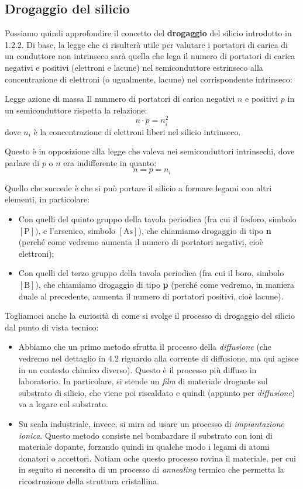 \documentclass[a4paper,11pt]{article}
\begin{document}
\subsection{Drogaggio del silicio}
Possiamo quindi approfondire il concetto del \textbf{drogaggio} del silicio introdotto in 1.2.2. Di base, la legge che ci risulterà utile per valutare i portatori di carica di un conduttore non intrinseco sarà quella che lega il numero di portatori di carica negativi e positivi (elettroni e lacune) nel semiconduttore estrinseco alla concentrazione di elettroni (o ugualmente, lacune) nel corrispondente intrinseco:
\begin{definition}{Legge azione di massa}
Il nunmero di portatori di carica negativi $n$ e positivi $p$ in un semiconduttore rispetta la relazione:	
$$
n \cdot p = n_i^2
$$
dove $n_i$ è la concentrazione di elettroni liberi nel silicio intrinseco.
\end{definition}

Questo è in opposizione alla legge che valeva nei semiconduttori intrinsechi, dove parlare di $p$ o $n$ era indifferente in quanto:
$$
n = p = n_i
$$

Quello che succede è che si può portare il silicio a formare legami con altri elementi, in particolare:
\begin{itemize}
	\item Con quelli del quinto gruppo della tavola periodica (fra cui il fosforo, simbolo $[\mathrm{P}])$, e l'arsenico, simbolo $[\mathrm{As}]$), che chiamiamo drogaggio di tipo \textbf{n} (perché come vedremo aumenta il numero di portatori negativi, cioè elettroni);
	\item Con quelli del terzo gruppo della tavola periodica (fra cui il boro, simbolo $[\mathrm{B}]$), che chiamiamo drogaggio di tipo \textbf{p} (perché come vedremo, in maniera duale al precedente, aumenta il numero di portatori positivi, cioè lacune).
\end{itemize}

Togliamoci anche la curiosità di come si svolge il processo di drogaggio del silicio dal punto di vista tecnico: 
\begin{itemize}
	\item 
Abbiamo che un primo metodo sfrutta il processo della \textit{diffusione} (che vedremo nel dettaglio in 4.2 riguardo alla corrente di diffusione, ma qui agisce in un contesto chimico diverso). Questo è il processo più diffuso in laboratorio. In particolare, si stende un \textit{film} di materiale drogante sul substrato di silicio, che viene poi riscaldato e quindi (appunto per \textit{diffusione}) va a legare col substrato.
	\item
Su scala industriale, invece, si mira ad usare un processo di \textit{impiantazione ionica}. Questo metodo consiste nel bombardare il substrato con ioni di materiale dopante, forzando quindi in qualche modo i legami di atomi donatori o accettori. Notiam oche questo processo rovina il materiale, per cui in seguito si necessita di un processo di \textit{annealing} termico che permetta la ricostruzione della struttura cristallina.
\end{itemize}
\end{document}
